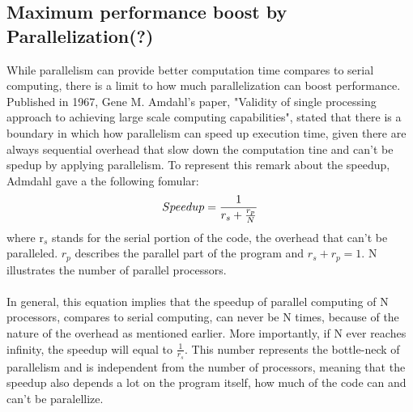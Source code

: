 \subsection{Maximum performance boost by Parallelization(?)} 
While parallelism can provide better computation time compares to serial computing, there is a limit to how much parallelization can boost performance. Published in 1967, Gene M. Amdahl's paper, "Validity of single processing approach to achieving large scale computing capabilities", stated that there is a boundary in which how parallelism can speed up execution time, given there are always sequential overhead that slow down the computation tine and can't be spedup by applying parallelism. To represent this remark about the speedup, Admdahl gave a the following fomular: \\
\begin{equation}
Speedup = \frac{1}{r_s + \frac{r_p}{N}} \\
\end{equation}
where r$_s$ stands for the serial portion of the code, the overhead that can't be paralleled. $r_p$ describes the parallel part of the program and $r_s + r_p = 1$. N illustrates the number of parallel processors. \\
~\\
In general, this equation implies that the speedup of parallel computing of N processors, compares to serial computing, can never be N times, because of the nature of the overhead as mentioned earlier. More importantly, if N ever reaches infinity, the speedup will equal to $\frac{1}{r_s}$. This number represents the bottle-neck of parallelism and is independent from the number of processors, meaning that the speedup also depends a lot on the program itself, how much of the code can and can't be paralellize. \\

